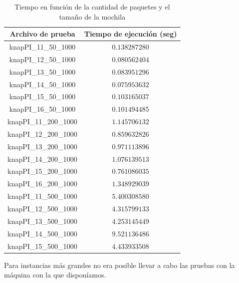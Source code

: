 \documentclass[a4paper,10pt]{article}
\begin{document}
\begin{table}[H]
\centering
\begin{tabular}{|c|c|}
\hline
Archivo de prueba	& Tiempo de ejecución (seg)\\\hline
knapPI\_11\_50\_1000	& $0.138287280$ \\\hline
knapPI\_12\_50\_1000	& $0.080562404$ \\\hline
knapPI\_13\_50\_1000	& $0.083951296$ \\\hline
knapPI\_14\_50\_1000	& $0.075953632$ \\\hline
knapPI\_15\_50\_1000	& $0.103165037$ \\\hline
knapPI\_16\_50\_1000	& $0.101494485$ \\\hline
knapPI\_11\_200\_1000	& $1.145706132$ \\\hline
knapPI\_12\_200\_1000	& $0.859632826$ \\\hline
knapPI\_13\_200\_1000	& $0.971113896$ \\\hline
knapPI\_14\_200\_1000	& $1.076139513$ \\\hline
knapPI\_15\_200\_1000	& $0.761086035$ \\\hline
knapPI\_16\_200\_1000	& $1.348929039$ \\\hline 
knapPI\_11\_500\_1000	& $5.400308580$ \\\hline 
knapPI\_12\_500\_1000	& $4.315799133$ \\\hline 
knapPI\_13\_500\_1000	& $4.253145449$ \\\hline 
knapPI\_14\_500\_1000	& $9.521136486$ \\\hline 
knapPI\_15\_500\_1000	& $4.433933508$ \\\hline 
\end{tabular}
\caption{Tiempo en función de la cantidad de paquetes y el tamaño de la mochila}
\label{tab:held}
\end{table}

Para instancias más grandes no era posible llevar a cabo las pruebas con la máquina con la que disponíamos.
\end{document}
